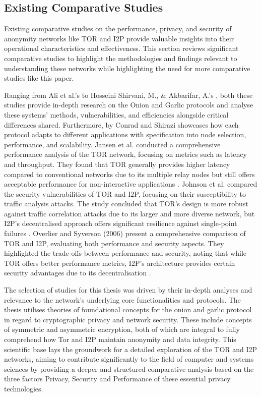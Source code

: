 \documentclass[12pt,conference]{IEEEtran}
\begin{document}
\subsection{Existing Comparative Studies}
Existing comparative studies on the performance, privacy, and security of anonymity networks like TOR and I2P provide valuable insights into their operational characteristics and effectiveness. This section reviews significant comparative studies to highlight the methodologies and findings relevant to understanding these networks while highlighting the need for more comparative studies like this paper.

Ranging from Ali et al.'s  \cite{TORVsI2P} to Hosseini Shirvani, M., \& Akbarifar, A.'s  \cite{aComparativeStudyOnAnonymizingNetworks}, both these studies provide in-depth research on the Onion and Garlic protocols and analyse these systems’ methods, vulnerabilities, and efficiencies alongside critical differences shared. Furthermore,  by Conrad and Shirazi \cite{aSurveyOnTORAndI2P} showcases how each protocol adapts to different applications with specification into node selection, performance, and scalability. Jansen et al. conducted a comprehensive performance analysis of the TOR network, focusing on metrics such as latency and throughput. They found that TOR generally provides higher latency compared to conventional networks due to its multiple relay nodes but still offers acceptable performance for non-interactive applications \cite{jansen2013lira}. Johnson et al. compared the security vulnerabilities of TOR and I2P, focusing on their susceptibility to traffic analysis attacks. The study concluded that TOR’s design is more robust against traffic correlation attacks due to its larger and more diverse network, but I2P’s decentralised approach offers significant resilience against single-point failures \cite{johnson2013users}. Overlier and Syverson (2006) present a comprehensive comparison of TOR and I2P, evaluating both performance and security aspects. They highlighted the trade-offs between performance and security, noting that while TOR offers better performance metrics, I2P's architecture provides certain security advantages due to its decentralisation \cite{overlier2006locating}.

The selection of studies for this thesis was driven by their in-depth analyses and relevance to the network's underlying core functionalities and protocols. The thesis utilises theories of foundational concepts for the onion and garlic protocol in regard to cryptographic privacy and network security. These include concepts of symmetric and asymmetric encryption, both of which are integral to fully comprehend how Tor and I2P maintain anonymity and data integrity. This scientific base lays the groundwork for a detailed exploration of the TOR and I2P networks, aiming to contribute significantly to the field of computer and systems sciences by providing a deeper and structured comparative analysis based on the three factors Privacy, Security and Performance of these essential privacy technologies.
\end{document}

